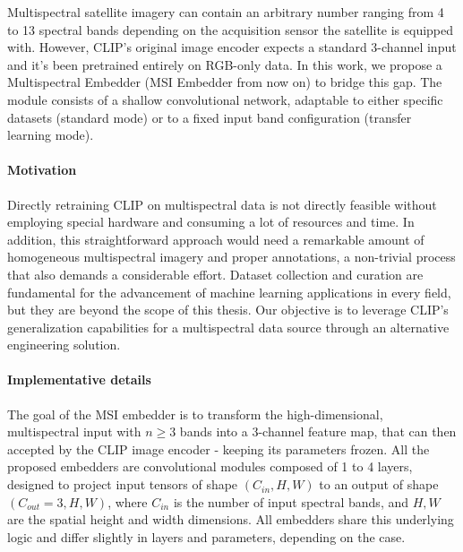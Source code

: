 \documentclass[a4paper, oneside, english]{sapthesis} %
\begin{document}
Multispectral satellite imagery can contain an arbitrary number ranging from 4 to 13 spectral bands depending on the acquisition sensor the satellite is equipped with. However, CLIP’s original image encoder expects a standard 3-channel input and it's been pretrained entirely on RGB-only data. In this work, we propose a Multispectral Embedder (MSI Embedder from now on) to bridge this gap. The module consists of a shallow convolutional network, adaptable to either specific datasets (standard mode) or to a fixed input band configuration (transfer learning mode).

\paragraph{Motivation} Directly retraining CLIP on multispectral data is not directly feasible without employing special hardware and consuming a lot of resources and time. In addition, this straightforward approach would need a remarkable amount of homogeneous multispectral imagery and proper annotations, a non-trivial process that also demands a considerable effort. Dataset collection and curation are fundamental for the advancement of machine learning applications in every field, but they are beyond the scope of this thesis. Our objective is to leverage CLIP’s generalization capabilities for a multispectral data source through an alternative engineering solution.

\paragraph{Implementative details} The goal of the MSI embedder is to transform the high-dimensional, multispectral input with $n \ge 3$ bands into a $3$-channel feature map, that can then accepted by the CLIP image encoder - keeping its parameters frozen. 
All the proposed embedders are convolutional modules composed of 1 to 4 layers, designed to project input tensors of shape $(C_{in}, H, W)$ to an output of shape $(C_{out} = 3, H, W)$, where $C_{in}$ is the number of input spectral bands, and $H, W$ are the spatial height and width dimensions. All embedders share this underlying logic and differ slightly in layers and parameters, depending on the case.
\end{document}
